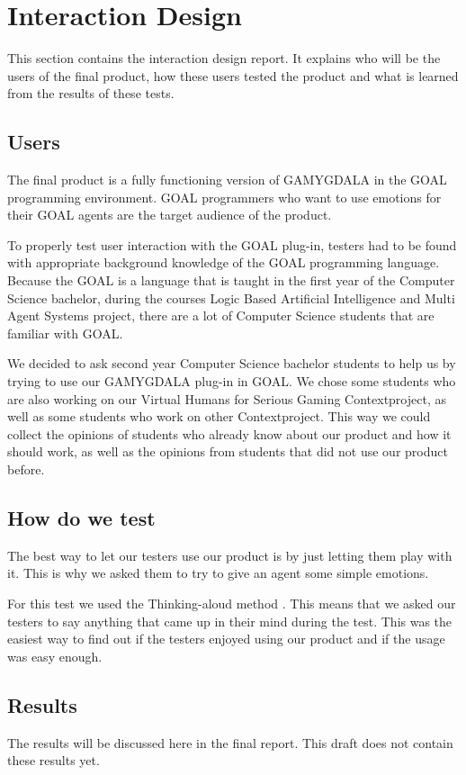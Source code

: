 \section{Interaction Design}
This section contains the interaction design report. It explains who will be the users of the final product, how these users tested the product and what is learned from the results of these tests.

\subsection{Users}
The final product is a fully functioning version of GAMYGDALA in the GOAL programming environment. GOAL programmers who want to use emotions for their GOAL agents are the target audience of the product.

To properly test user interaction with the GOAL plug-in, testers had to be found with appropriate background knowledge of the GOAL programming language. Because the GOAL is a language that is taught in the first year of the Computer Science bachelor, during the courses Logic Based Artificial Intelligence and Multi Agent Systems project, there are a lot of Computer Science students that are familiar with GOAL.

We decided to ask second year Computer Science bachelor students to help us by trying to use our GAMYGDALA plug-in in GOAL. We chose some students who are also working on our Virtual Humans for Serious Gaming Contextproject, as well as some students who work on other Contextproject. This way we could collect the opinions of students who already know about our product and how it should work, as well as the opinions from students that did not use our product before.

\subsection{How do we test}
The best way to let our testers use our product is by just letting them play with it. This is why we asked them to try to give an agent some simple emotions. \par
For this test we used the Thinking-aloud method \citep{thinking-aloud}. This means that we asked our testers to say anything that came up in their mind during the test. This was the easiest way to find out if the testers enjoyed using our product and if the usage was easy enough.

\subsection{Results}
The results will be discussed here in the final report. This draft does not contain these results yet.